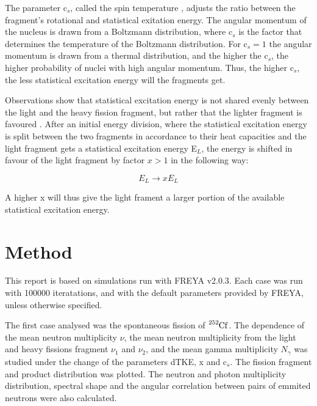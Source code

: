 \documentclass[]{article}
\begin{document}
The parameter c$_s$, called the spin temperature \cite{FREYAusemanual}, adjusts the ratio between the fragment's rotational and statistical exitation energy. The angular momentum of the nucleus is drawn from a Boltzmann distribution, where c$_s$ is the factor that determines the temperature of the Boltzmann distribution. For c$_s = 1$ the angular momentum is drawn from a thermal distribution, and the higher the c$_s$, the higher probability of nuclei with high angular momentum. Thus, the higher c$_s$, the less statistical excitation energy will the fragments get. \par 

\vspace{3mm}

Observations show that statistical excitation energy is not shared evenly between the light and the heavy fission fragment, but rather that the lighter fragment is favoured \cite{FREYAusemanual}. After an initial energy division, where the statistical excitation energy is split between the two fragments in accordance to their heat capacities and the light fragment gets a statistical excitation energy E$_L$, the energy is shifted in favour of the light fragment by factor $x > 1$ in the following way:

\begin{equation}
	E_L \rightarrow xE_L
\end{equation}

 A higher x will thus give the light frament a larger portion of the available statistical excitation energy.

\section{Method}

This report is based on simulations run with FREYA v2.0.3. Each case was run with 100000 iteratations, and with the default parameters provided by FREYA, unless otherwise specified. 

The first case analysed was the spontaneous fission of $\ce{^{252}Cf}$. The dependence of the mean neutron multiplicity $\nu$, the mean neutron multiplicity from the light  and heavy fissions fragment $\nu_1$ and $\nu_2$, and the mean gamma multiplicity $N_{\gamma}$ was studied under the change of the parameters dTKE, x and c$_s$. The fission fragment and product distribution was plotted. The neutron and photon multiplicity distribution, spectral shape and the angular correlation between pairs of emmited neutrons were also calculated.
\end{document}

